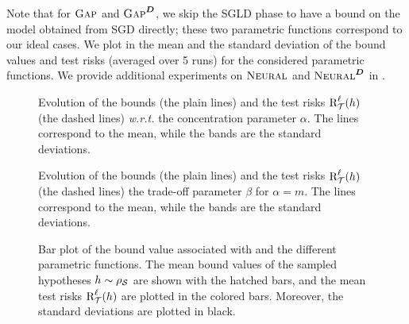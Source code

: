 \documentclass[twoside]{article}
\theoremstyle{plain}
\begin{document}
Note that for $\text{\sc Gap}$ and $\text{\sc Gap}^{\boldsymbol{D}}$, we skip the SGLD phase to have a bound on the model obtained from SGD directly; these two parametric functions correspond to our ideal cases.
We plot in  the mean and the standard deviation of the bound values and test risks (averaged over 5 runs) for the considered parametric functions.
We provide additional experiments on $\text{\sc Neural}$ and $\text{\sc Neural}^{\boldsymbol{D}}$ in .

\begin{figure}[!ht]
    \centering
    
    \caption{Evolution of the bounds (the plain lines) and the test risks $\text{R}^{\ell}_{\mathcal{T}}(h)$ (the dashed lines) {\it w.r.t.} the concentration parameter $\alpha$.
    The lines correspond to the mean, while the bands are the standard deviations.}
    \label{fig:emp-risk}
\end{figure}

\begin{figure}[!ht]
    \centering
    
    \caption{Evolution of the bounds (the plain lines) and the test risks $\text{R}^{\ell}_{\mathcal{T}}(h)$ (the dashed lines) \wrt the trade-off parameter $\beta$ for $\alpha=m$.
    The lines correspond to the mean, while the bands are the standard deviations.}
    \label{fig:reg-risk}
\end{figure}

\begin{figure}[!ht]
    \centering
    
    \caption{Bar plot of the bound value associated with  and the different parametric functions. 
    The mean bound values of the sampled hypotheses $h\sim\rho_{\mathcal{S}}$ are shown with the hatched bars, and the mean test risks $\text{R}^{\ell}_{\mathcal{T}}(h)$ are plotted in the colored bars. Moreover, the standard deviations are plotted in black.}
    \label{fig:neural-comp}
\end{figure}
\end{document}
